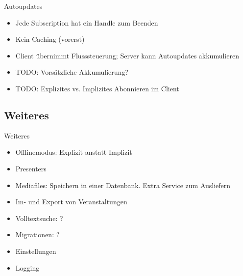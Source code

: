 \documentclass[10pt]{beamer}
\begin{document}
\begin{frame}{Autoupdates}
	\begin{itemize}
		\item Jede Subscription hat ein Handle zum Beenden
		\item Kein Caching (vorerst)
		\item Client übernimmt Flusssteuerung; Server kann Autoupdates akkumulieren
		\item TODO: Vorsätzliche Akkumulierung?
		\item TODO: Explizites vs. Implizites Abonnieren im Client
	\end{itemize}
\end{frame}


\subsection{Weiteres}
\begin{frame}{Weiteres}
	\begin{itemize}
		\item Offlinemodus: Explizit anstatt Implizit
		\item Presenters
		\item Mediafiles: Speichern in einer Datenbank. Extra Service zum Ausliefern
		\item Im- und Export von Veranstaltungen
		\item Volltextsuche: ?
		\item Migrationen: ?
		\item Einstellungen
		\item Logging
	\end{itemize}
\end{frame}
\end{document}
